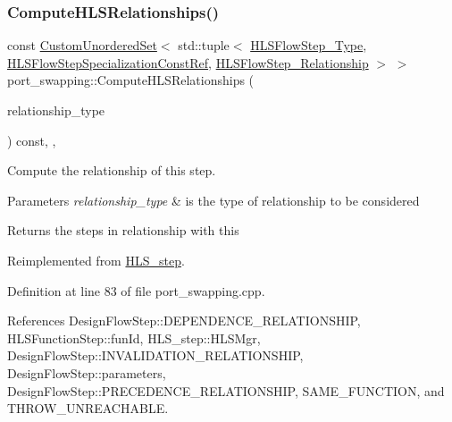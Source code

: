 \subsubsection{\texorpdfstring{Compute\+H\+L\+S\+Relationships()}{ComputeHLSRelationships()}}
{\footnotesize\ttfamily const \hyperlink{classCustomUnorderedSet}{Custom\+Unordered\+Set}$<$ std\+::tuple$<$ \hyperlink{hls__step_8hpp_ada16bc22905016180e26fc7e39537f8d}{H\+L\+S\+Flow\+Step\+\_\+\+Type}, \hyperlink{hls__step_8hpp_a5fdd2edf290c196531d21d68e13f0e74}{H\+L\+S\+Flow\+Step\+Specialization\+Const\+Ref}, \hyperlink{hls__step_8hpp_a3ad360b9b11e6bf0683d5562a0ceb169}{H\+L\+S\+Flow\+Step\+\_\+\+Relationship} $>$ $>$ port\+\_\+swapping\+::\+Compute\+H\+L\+S\+Relationships (\begin{DoxyParamCaption}\item[{const \hyperlink{classDesignFlowStep_a723a3baf19ff2ceb77bc13e099d0b1b7}{Design\+Flow\+Step\+::\+Relationship\+Type}}]{relationship\+\_\+type }\end{DoxyParamCaption}) const\hspace{0.3cm}{\ttfamily [override]}, {\ttfamily [protected]}, {\ttfamily [virtual]}}



Compute the relationship of this step. 


\begin{DoxyParams}{Parameters}
{\em relationship\+\_\+type} & is the type of relationship to be considered \\
\hline
\end{DoxyParams}
\begin{DoxyReturn}{Returns}
the steps in relationship with this 
\end{DoxyReturn}


Reimplemented from \hyperlink{classHLS__step_aed0ce8cca9a1ef18e705fc1032ad4de5}{H\+L\+S\+\_\+step}.



Definition at line 83 of file port\+\_\+swapping.\+cpp.



References Design\+Flow\+Step\+::\+D\+E\+P\+E\+N\+D\+E\+N\+C\+E\+\_\+\+R\+E\+L\+A\+T\+I\+O\+N\+S\+H\+IP, H\+L\+S\+Function\+Step\+::fun\+Id, H\+L\+S\+\_\+step\+::\+H\+L\+S\+Mgr, Design\+Flow\+Step\+::\+I\+N\+V\+A\+L\+I\+D\+A\+T\+I\+O\+N\+\_\+\+R\+E\+L\+A\+T\+I\+O\+N\+S\+H\+IP, Design\+Flow\+Step\+::parameters, Design\+Flow\+Step\+::\+P\+R\+E\+C\+E\+D\+E\+N\+C\+E\+\_\+\+R\+E\+L\+A\+T\+I\+O\+N\+S\+H\+IP, S\+A\+M\+E\+\_\+\+F\+U\+N\+C\+T\+I\+ON, and T\+H\+R\+O\+W\+\_\+\+U\+N\+R\+E\+A\+C\+H\+A\+B\+LE.

